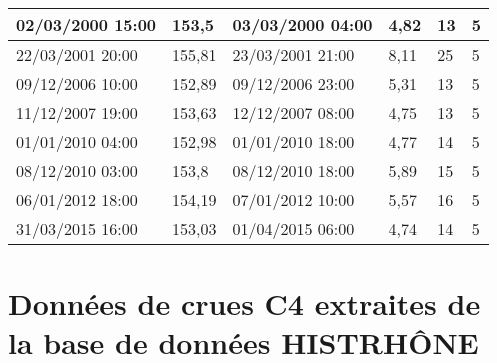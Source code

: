\begin{longtable}{|p{3cm}|p{2.1cm}|p{3cm}|p{2cm}|l|l|}
        02/03/2000 15:00 & 153,5 & 03/03/2000 04:00 & 4,82 & 13 & 5 \\ \hline
        22/03/2001 20:00 & 155,81 & 23/03/2001 21:00 & 8,11 & 25 & 5 \\ \hline
        09/12/2006 10:00 & 152,89 & 09/12/2006 23:00 & 5,31 & 13 & 5 \\ \hline
        11/12/2007 19:00 & 153,63 & 12/12/2007 08:00 & 4,75 & 13 & 5 \\ \hline
        01/01/2010 04:00 & 152,98 & 01/01/2010 18:00 & 4,77 & 14 & 5 \\ \hline
        08/12/2010 03:00 & 153,8 & 08/12/2010 18:00 & 5,89 & 15 & 5 \\ \hline
        06/01/2012 18:00 & 154,19 & 07/01/2012 10:00 & 5,57 & 16 & 5 \\ \hline
        31/03/2015 16:00 & 153,03 & 01/04/2015 06:00 & 4,74 & 14 & 5 \\ \hline

\end{longtable}

\newpage
	
	\section{Données de crues C4 extraites de la base de données HISTRHÔNE}
	\label{sec:TabC4}



